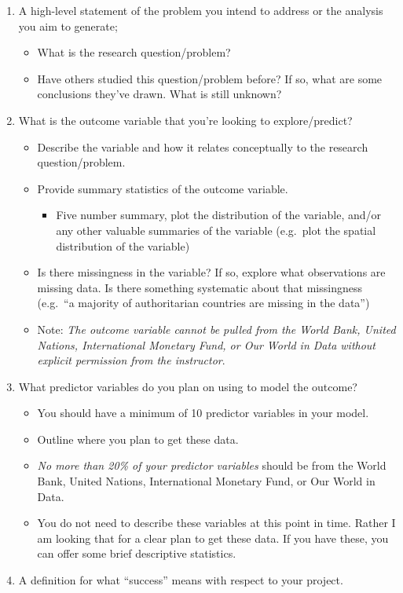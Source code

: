 \documentclass[
  12pt,
]{article}
\providecommand{\tightlist}{%
  \setlength{\itemsep}{0pt}\setlength{\parskip}{0pt}}
\begin{document}
\begin{enumerate}
\def\labelenumi{\arabic{enumi}.}
\tightlist
\item
  A high-level statement of the problem you intend to address or the
  analysis you aim to generate;

  \begin{itemize}
  \tightlist
  \item
    What is the research question/problem?
  \item
    Have others studied this question/problem before? If so, what are
    some conclusions they've drawn. What is still unknown?
  \end{itemize}
\item
  What is the outcome variable that you're looking to explore/predict?

  \begin{itemize}
  \tightlist
  \item
    Describe the variable and how it relates conceptually to the
    research question/problem.
  \item
    Provide summary statistics of the outcome variable.

    \begin{itemize}
    \tightlist
    \item
      Five number summary, plot the distribution of the variable, and/or
      any other valuable summaries of the variable (e.g.~plot the
      spatial distribution of the variable)
    \end{itemize}
  \item
    Is there missingness in the variable? If so, explore what
    observations are missing data. Is there something systematic about
    that missingness (e.g.~``a majority of authoritarian countries are
    missing in the data'')
  \item
    Note: \emph{The outcome variable cannot be pulled from the World
    Bank, United Nations, International Monetary Fund, or Our World in
    Data without explicit permission from the instructor}.
  \end{itemize}
\item
  What predictor variables do you plan on using to model the outcome?

  \begin{itemize}
  \tightlist
  \item
    You should have a minimum of 10 predictor variables in your model.
  \item
    Outline where you plan to get these data.
  \item
    \emph{No more than 20\% of your predictor variables} should be from
    the World Bank, United Nations, International Monetary Fund, or Our
    World in Data.
  \item
    You do not need to describe these variables at this point in time.
    Rather I am looking that for a clear plan to get these data. If you
    have these, you can offer some brief descriptive statistics.
  \end{itemize}
\item
  A definition for what ``success'' means with respect to your project.


\end{enumerate}
\end{document}
